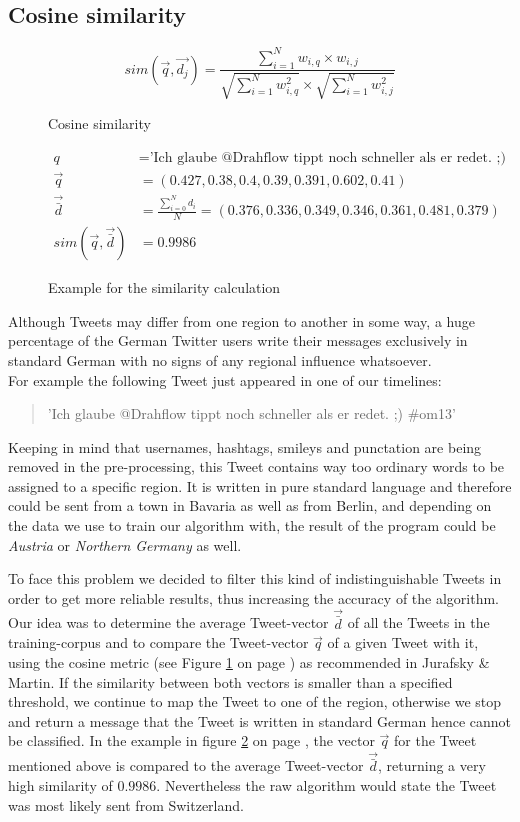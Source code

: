 \documentclass[../Main.tex]{subfiles}
\begin{document}
\subsection{Cosine similarity}
\begin{figure}
  \[ sim(\vec{q},\vec{d_j}) = \frac{\sum^N_{i=1} w_{i,q} \times w_{i,j}}{\sqrt{\sum^N_{i=1}w^2_{i,q}} \times \sqrt{\sum^N_{i=1}w^2_{i,j}}} \]
  \caption{Cosine similarity}
  \label{cos_sim}
\end{figure}
\begin{figure}
 \begin{align*}
  q &= \textrm{'Ich glaube @Drahflow tippt noch schneller als er redet. ;) \#om13' } \\
  \vec{q} &= (0.427, 0.38, 0.4, 0.39, 0.391, 0.602,  0.41) \\ 
   \vec{\bar{d}} &= \frac{\sum^N_{i=0} d_i}{N} =  (0.376, 0.336, 0.349, 0.346, 0.361, 0.481,  0.379) \\
  sim(\vec{q}, \vec{\bar{d}}) &= 0.9986 
\end{align*}
  \caption{Example for the similarity calculation}
  \label{cos_sim_example}
\end{figure}
Although Tweets may differ from one region to another in some way, a huge percentage of the German Twitter users write their messages exclusively in standard German with no signs of any regional influence whatsoever. \\
For example the following Tweet just appeared in one of our timelines:
\begin{quote}
'Ich glaube @Drahflow tippt noch schneller als er redet. ;) \#om13'
\end{quote}
Keeping in mind that usernames, hashtags, smileys and punctation are being removed in the pre-processing, this Tweet contains way too ordinary words to be assigned to a specific region. It is written in pure standard language and therefore could be sent from a town in Bavaria as well as from Berlin, and depending on the data we use to train our algorithm with, the result of the program could be \textit{Austria} or \textit{Northern Germany} as well.

To face this problem we decided to filter this kind of indistinguishable Tweets in order to get more reliable results, thus increasing the accuracy of the algorithm. \\
Our idea was to determine the average Tweet-vector $\vec{\bar{d}}$ of all the Tweets in the training-corpus and to compare the Tweet-vector $\vec{q}$ of a given Tweet with it, using the cosine metric (see Figure \ref{cos_sim} on page \pageref{cos_sim}) as recommended in Jurafsky \& Martin. If the similarity between both vectors is smaller than a specified threshold, we continue to map the Tweet to one of the region, otherwise we stop and return a message that the Tweet is written in standard German hence cannot be classified. In the example in figure \ref{cos_sim_example} on page \pageref{cos_sim_example}, the vector $\vec{q}$ for the Tweet mentioned above is compared to the average Tweet-vector $\vec{\bar{d}}$, returning a very high similarity of $0.9986$. Nevertheless the raw algorithm would state the Tweet was most likely sent from Switzerland.
\end{document}
